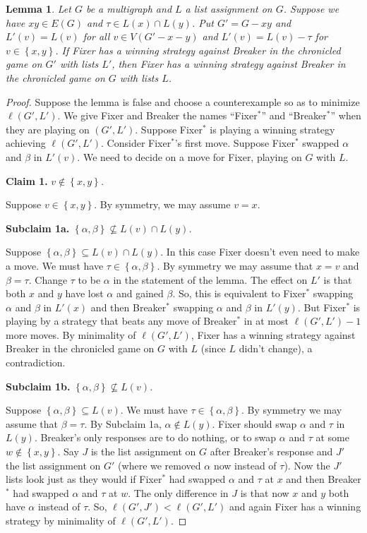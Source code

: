 \documentclass[12pt,reqno]{amsart}
\theoremstyle{plain}
\newtheorem{lem}[thm]{Lemma}
\theoremstyle{definition}
\theoremstyle{remark}
\newcommand{\set}[1]{\left\{ #1 \right\}}
\begin{document}
\begin{lem}\label{ColorOneEdgeAndPlayOnRest}
Let $G$ be a multigraph and $L$ a list assignment on $G$.  Suppose we have $xy \in E(G)$ and $\tau \in L(x) \cap L(y)$. Put $G' = G - xy$ and 
$L'(v) = L(v)$ for all $v \in V(G' - x - y)$ and $L'(v) = L(v) - \tau$ for $v \in \set{x,y}$. If Fixer has a winning strategy against Breaker in the chronicled game on $G'$ with lists $L'$, then Fixer has a winning strategy against Breaker in the chronicled game on $G$ with lists $L$.
\end{lem}
\begin{proof}
Suppose the lemma is false and choose a counterexample so as to minimize $\ell(G', L')$.  We give Fixer and Breaker the names ``Fixer$^*$'' and ``Breaker$^*$'' when they are playing on $(G', L')$.  Suppose Fixer$^*$ is playing a winning strategy achieving $\ell(G', L')$.  Consider Fixer$^*$'s first move.  Suppose Fixer$^*$ swapped $\alpha$ and $\beta$ in $L'(v)$.   We need to decide on a move for Fixer, playing on $G$ with $L$.

\noindent\textbf{Claim 1.  }\textit{$v \not \in \set{x, y}$.}

Suppose $v \in \set{x,y}$. By symmetry, we may assume $v = x$.

\noindent\textbf{Subclaim 1a.  }\textit{$\set{\alpha, \beta} \not \subseteq L(v) \cap L(y)$.}

Suppose $\set{\alpha, \beta} \subseteq L(v) \cap L(y)$. In this case Fixer doesn't even need to make a move.
We must have $\tau \in \set{\alpha, \beta}$. By symmetry we may assume that $x = v$ and $\beta = \tau$.  Change $\tau$ to be $\alpha$ in the statement of the lemma.  The effect on $L'$ is that both $x$ and $y$ have lost $\alpha$ and gained $\beta$.  So, this is equivalent to Fixer$^*$ swapping $\alpha$ and $\beta$ in $L'(x)$ and then Breaker$^*$ swapping $\alpha$ and $\beta$ in $L'(y)$.  But Fixer$^*$ is playing by a strategy that beats any move of Breaker$^*$ in at most $\ell(G', L') - 1$ more moves. By minimality of $\ell(G', L')$, Fixer has a winning strategy against Breaker in the chronicled game on $G$ with $L$ (since $L$ didn't change), a contradiction.

\noindent\textbf{Subclaim 1b.  }\textit{$\set{\alpha, \beta} \not \subseteq L(v)$.}

Suppose $\set{\alpha, \beta} \subseteq L(v)$. We must have $\tau \in \set{\alpha, \beta}$. By symmetry we may assume that $\beta = \tau$.  By Subclaim 1a, $\alpha \not \in L(y)$.  Fixer should swap $\alpha$ and $\tau$ in $L(y)$.  Breaker's only responses are to do nothing, or to swap $\alpha$ and $\tau$ at some $w \not \in \set{x,y}$.  Say $J$ is the list assignment on $G$ after Breaker's response and $J'$ the list assignment on $G'$ (where we removed $\alpha$ now instead of $\tau$).  Now the $J'$ lists look just as they would if Fixer$^*$ had swapped $\alpha$ and $\tau$ at $x$ and then Breaker$^*$ had swapped $\alpha$ and $\tau$ at $w$.  The only difference in $J$ is that now $x$ and $y$ both have $\alpha$ instead of $\tau$.  So, $\ell(G', J') < \ell(G', L')$ and again Fixer has a winning strategy by minimality of $\ell(G', L')$.


\end{proof}
\end{document}
